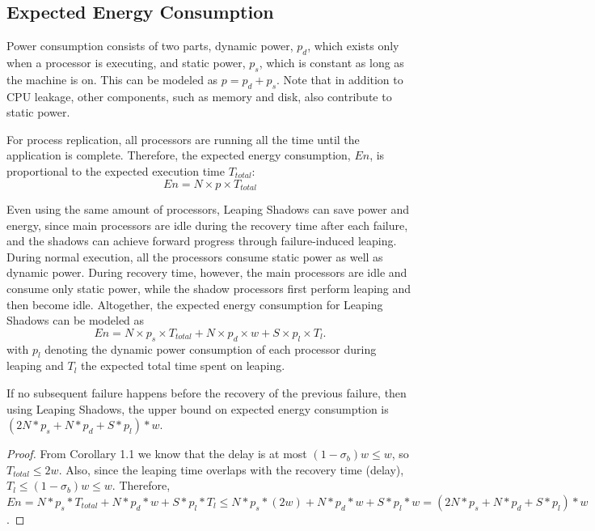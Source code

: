 \subsection{Expected Energy Consumption}
\label{sec:anal_energy}
Power consumption consists of two parts, dynamic power, $p_d$, which exists only when a processor is executing, and static power, $p_s$, which is constant as long as the machine is on. This can be modeled as $p = p_d + p_s$. Note that in addition to CPU leakage, other components, such as memory and disk, also contribute to static power. 

For process replication, all processors are running all the time until the application is complete. Therefore, the expected energy consumption, $En$, is proportional to the expected execution time $T_{total}$: 
\begin{equation}
En = N \times p \times T_{total}
\label{eq:exp_energy1}
\end{equation} 

Even using the same amount of processors, Leaping Shadows can save power and energy, since main processors are idle during the recovery time after each failure, and the shadows can achieve forward progress through failure-induced leaping. During normal execution, all the processors consume static power as well as dynamic power. During recovery time, however, the main processors are idle and consume only static power, while the shadow processors first perform leaping and then become idle. Altogether, the expected energy consumption for Leaping Shadows can be modeled as 
\begin{equation}
En = N \times p_s \times T_{total} + N \times p_d \times w + S \times p_{l} \times T_l.
\label{eq:exp_energy2}
\end{equation}
with $p_{l}$ denoting the dynamic power consumption of each processor during leaping and $T_l$ the expected total time spent on leaping. 

\begin{theorem}
If no subsequent failure happens before the recovery of the previous failure, then using Leaping Shadows, the upper bound on expected energy consumption is
$(2N * p_s + N * p_d + S * p_{l})*w$.
\end{theorem}
\begin{proof}
From Corollary 1.1 we know that the delay is at most $(1-\sigma_b)w \le w$, so $T_{total} \le 2w$. Also, since the leaping time overlaps with the recovery time (delay), $T_l \le (1-\sigma_b)w \le w$. Therefore, $En = N * p_s * T_{total} + N * p_d * w + S * p_{l} * T_l \le N * p_s * (2w) + N * p_d * w + S * p_{l} * w = (2N * p_s + N * p_d + S * p_{l})*w$.
\end{proof}










